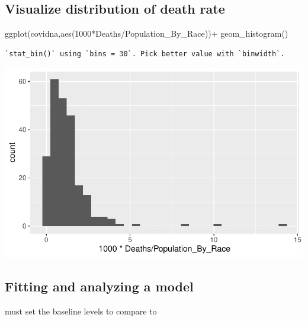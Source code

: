 \documentclass[
  letterpaper,
  DIV=11,
  numbers=noendperiod]{scrartcl}
\newenvironment{Shaded}{\begin{snugshade}}{\end{snugshade}}
\newcommand{\DecValTok}[1]{\textcolor[rgb]{0.68,0.00,0.00}{#1}}
\newcommand{\FunctionTok}[1]{\textcolor[rgb]{0.28,0.35,0.67}{#1}}
\newcommand{\NormalTok}[1]{\textcolor[rgb]{0.00,0.23,0.31}{#1}}
\newcommand{\SpecialCharTok}[1]{\textcolor[rgb]{0.37,0.37,0.37}{#1}}
\begin{document}
\subsection{Visualize distribution of death
rate}\label{visualize-distribution-of-death-rate}

\begin{Shaded}
\begin{Highlighting}[]
\FunctionTok{ggplot}\NormalTok{(covidna,}\FunctionTok{aes}\NormalTok{(}\DecValTok{1000}\SpecialCharTok{*}\NormalTok{Deaths}\SpecialCharTok{/}\NormalTok{Population\_By\_Race))}\SpecialCharTok{+}
  \FunctionTok{geom\_histogram}\NormalTok{()}
\end{Highlighting}
\end{Shaded}

\begin{verbatim}
`stat_bin()` using `bins = 30`. Pick better value with `binwidth`.
\end{verbatim}

\includegraphics{StatsForFinalCSV_files/figure-pdf/unnamed-chunk-5-1.pdf}

\subsection{Fitting and analyzing a
model}\label{fitting-and-analyzing-a-model}

must set the baseline levels to compare to
\end{document}
